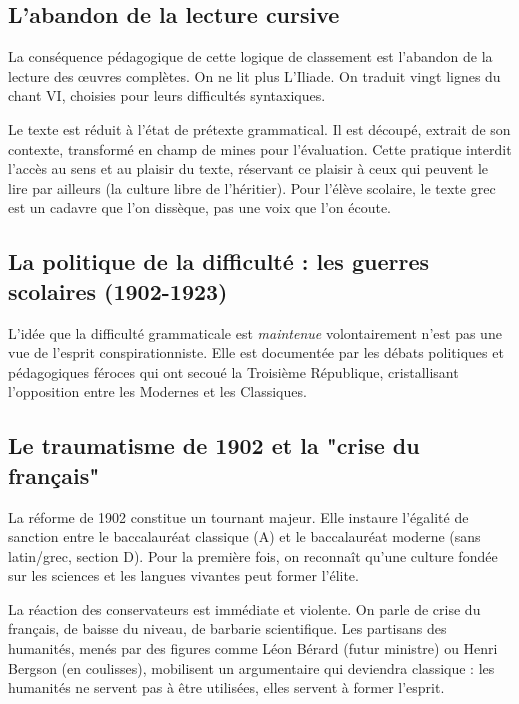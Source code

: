 \subsection{L'abandon de la lecture cursive}

La conséquence pédagogique de cette logique de classement est l'abandon de la lecture des œuvres
complètes. On ne lit plus L'Iliade. On traduit vingt lignes du chant VI, choisies pour leurs
difficultés syntaxiques.

Le texte est réduit à l'état de \og prétexte grammatical\fg{}.\cite{I-2-3-ref16} Il est découpé,
extrait de son contexte, transformé en champ de mines pour l'évaluation. Cette pratique interdit
l'accès au sens et au plaisir du texte, réservant ce plaisir à ceux qui peuvent le lire par ailleurs
(la culture libre de l'héritier). Pour l'élève scolaire, le texte grec est un cadavre que l'on
dissèque, pas une voix que l'on écoute.



\subsection{La politique de la difficulté : les guerres scolaires (1902-1923)}

L'idée que la difficulté grammaticale est \textit{maintenue} volontairement n'est pas une vue de
l'esprit conspirationniste. Elle est documentée par les débats politiques et pédagogiques féroces
qui ont secoué la Troisième République, cristallisant l'opposition entre les \og Modernes\fg{} et
les \og Classiques\fg{}.



\subsection{Le traumatisme de 1902 et la "crise du français"}

La réforme de 1902 constitue un tournant majeur. Elle instaure l'égalité de sanction entre le
baccalauréat classique (A) et le baccalauréat moderne (sans latin/grec, section
D).\cite{I-2-3-ref17} Pour la première fois, on reconnaît qu'une culture fondée sur les sciences et
les langues vivantes peut former l'élite.

La réaction des conservateurs est immédiate et violente. On parle de \og crise du français\fg{}, de
\og baisse du niveau\fg{}, de \og barbarie scientifique\fg{}.\cite{I-2-3-ref6} Les partisans des
humanités, menés par des figures comme Léon Bérard (futur ministre) ou Henri Bergson (en coulisses),
mobilisent un argumentaire qui deviendra classique : les humanités ne servent pas à être utilisées,
elles servent à former l'esprit.



